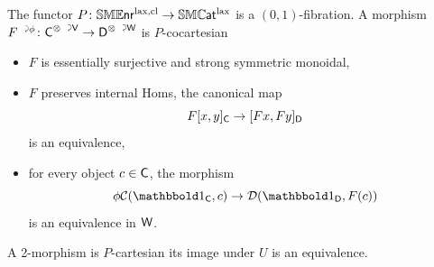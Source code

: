\documentclass[a4paper,11pt]{article}
\begin{document}
\begin{propn}\label{propn:SMENRlcl cocart}
  The functor $P \colon \SMENRlcl \to \SMCATl$ is a
  $(0,1)$-fibration. A morphism
  $\ract{F}{\phi} \colon \utract{C}{V} \to \utract{D}{W}$ is
  $P$-cocartesian \IFF{}
  \begin{itemize}
  \item   $F$ is essentially surjective and strong
    symmetric monoidal,
  \item $F$ preserves internal Homs, \ie{} the canonical map
    \[ F[x,y]_{\oC} \to [Fx,Fy]_{\oD}\]
    is an equivalence,
  \item for every
  object $c \in \textup{\textsf{C}}$, the morphism
  \[ \phi\eC(\bbone_{\oC}, c) \to \eD(\bbone_{\oD}, F(c))\] is an
  equivalence in $\textup{\textsf{W}}$.
  \end{itemize}
  A 2-morphism is $P$-cartesian \IFF{} its image
  under $U$ is an equivalence.
\end{propn}
\end{document}
